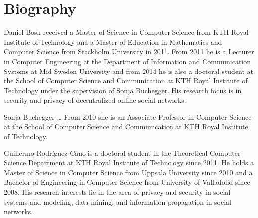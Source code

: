 \documentclass[a4paper]{llncs}
\begin{document}
\printbibliography{}


\appendix
\section{Biography}
\label{Biography}

Daniel Bosk received a Master of Science in Computer Science from KTH Royal 
Institute of Technology and a Master of Education in Mathematics and Computer 
Science from Stockholm University in 2011.
From 2011 he is a Lecturer in Computer Engineering at the Department of 
Information and Communication Systems at Mid Sweden University and from 2014 he 
is also a doctoral student at the School of Computer Science and Communication 
at KTH Royal Institute of Technology under the supervision of Sonja Buchegger.
His research focus is in security and privacy of decentralized online social 
networks.

Sonja Buchegger \dots
From 2010 she is an Associate Professor in Computer Science at the School of 
Computer Science and Communication at KTH Royal Institute of Technology.

Guillermo Rodr\'{i}guez-Cano is a doctoral student in the Theoretical Computer Science 
Department at KTH Royal Institute of Technology since 2011. He holds a Master of 
Science in Computer Science from Uppsala University since 2010 and a Bachelor of 
Engineering in Computer Science from University of Valladolid since 2008.
His research interests lie in the area of privacy and security in social systems 
and modeling, data mining, and information propagation in social networks.
\end{document}
